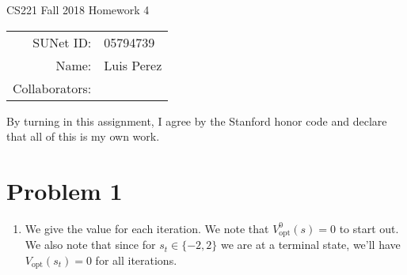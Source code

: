 \documentclass[12pt]{article}
\begin{document}
\begin{center}
{\Large CS221 Fall 2018 Homework 4}

\begin{tabular}{rl}
SUNet ID: & 05794739 \\
Name: & Luis Perez \\
Collaborators: &
\end{tabular}
\end{center}

By turning in this assignment, I agree by the Stanford honor code and declare
that all of this is my own work.

\section*{Problem 1}

\begin{enumerate}[label=(\alph*)]
  \item We give the value for each iteration. We note that $V^0_{\text{opt}}(s) = 0$ to start out. We also note that since for $s_t \in \{-2, 2\}$ we are at a terminal state, we'll have $V_{\text{opt}}(s_t) = 0$ for all iterations.


\end{enumerate}
\end{document}
